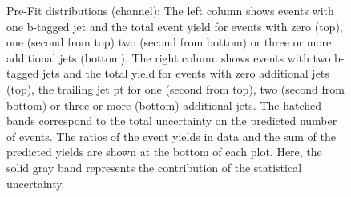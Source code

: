 \begin{figure}[htbp!]
\begin{center}
\caption{Pre-Fit distributions (\ee channel): 
  The left column shows events with one b-tagged jet and the total event yield for events with zero (top), one (second from top)
  two (second from bottom) or three or more additional jets (bottom).
  The right column shows events with two b-tagged jets and the total yield for events with zero additional jets (top),
  the trailing jet pt for one (second from top),
  two (second from bottom) or three or more (bottom) additional jets.
  The hatched bands correspond to the total uncertainty on the predicted number of events. The ratios of the event yields in data and the sum of the
  predicted yields are shown at the bottom of each plot. Here, the solid
  gray band represents the contribution of the statistical uncertainty.  
       \label{fig:xsec_ee_inputdistr}}
  \end{center}
\end{figure}


